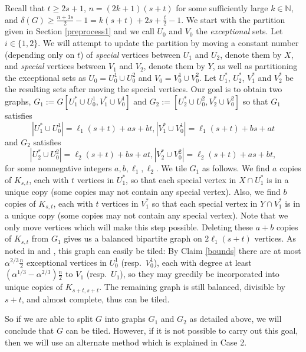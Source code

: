 \documentclass[oneside,12pt]{memoir}
\begin{document}
Recall that $t\geq 2s+1$, $n=(2k+1)(s+t)$ for some sufficiently large $k\in \mathbb{N}$, and $\delta(G)\geq \frac{n+3s}{2}-1=k(s+t)+2s+\frac{t}{2}-1$.  We start with the partition given in Section \ref{preprocess1} and we call $U_0$ and $V_0$ the \emph{exceptional} sets. Let $i\in \{1,2\}$. We will attempt to update the partition by moving a constant number (depending only on $t$) of \emph{special} vertices between $U_1$ and $U_2$, denote them by $X$, and \emph{special} vertices between $V_1$ and $V_2$, denote them by $Y$, as well as partitioning the exceptional sets as $U_0=U_0^1\cup U_0^2$ and $V_0=V_0^1\cup V_0^2$.  Let $U_1^*$, $U_2^*$, $V_1^*$ and $V_2^*$ be the resulting sets after moving the special vertices. %
Our goal is to obtain two graphs, $G_1:=G[U_1^*\cup U_0^1, V_1^*\cup V_0^1]$ and $G_2:=[U_2^*\cup U_0^2, V_2^*\cup V_0^2]$ so that $G_1$ satisfies $$|U_1^*\cup U_0^1|=\ell_1(s+t)+as+bt, |V_1^*\cup V_0^1|=\ell_1(s+t)+bs+at$$ and $G_2$ satisfies $$|U_2^*\cup U_0^2|=\ell_2(s+t)+bs+at, |V_2^*\cup V_0^2|=\ell_2(s+t)+as+bt,$$ for some nonnegative integers $a,b,\ell_1,\ell_2$.  We tile $G_1$ as follows.  We find $a$ copies of $K_{s,t}$, each with $t$ vertices in $U_1^*$, so that each special vertex in $X\cap U_1^*$ is in a unique copy (some copies may not contain any special vertex). Also, we find $b$ copies of $K_{s,t}$, each with $t$ vertices in $V_1^*$ so that each special vertex in $Y\cap V_1^*$ is in a unique copy (some copies may not contain any special vertex).  Note that we only move vertices which will make this step possible. Deleting these $a+b$ copies of $K_{s,t}$ from $G_1$ gives us a balanced bipartite graph on $2\ell_1(s+t)$ vertices.  As noted in \cite{Z} and \cite{HS}, this graph can easily be tiled:  By Claim \ref{bounds} there are at most $\alpha^{2/3}\frac{n}{2}$ exceptional vertices in $U_0^1$ (resp.~$V_0^1$), each with degree at least $(\alpha^{1/3}-\alpha^{2/3})\frac{n}{2}$ to $V_1$ (resp.~$U_1$), so they may greedily be incorporated into unique copies of $K_{s+t,s+t}$.  The remaining graph is still balanced, divisible by $s+t$, and almost complete, thus can be tiled.

So if we are able to split $G$ into graphs $G_1$ and $G_2$ as detailed above, we will conclude that $G$ can be tiled.  However, if it is not possible to carry out this goal, then we will use an alternate method which is explained in Case 2.
\end{document}
